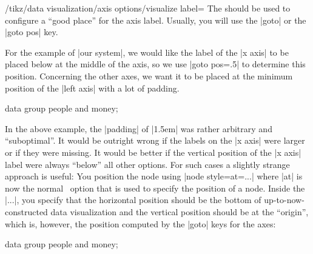 \begin{key}{/tikz/data visualization/axis options/visualize label=}
    The  should be used to configure a ``good place'' for the
    axis label. Usually, you will use the |goto| or the |goto pos| key.

    For the example of |our system|, we would like the label of the |x axis| to
    be placed below at the middle of the axis, so we use |goto pos=.5| to
    determine this position. Concerning the other axes, we want it to be placed
    at the minimum position of the |left axis| with a lot of padding.
\begin{codeexample}[width=7cm,preamble={\usetikzlibrary{datavisualization}}]
%
\tikz \datavisualization [
    our system,
    x axis={attribute=time, ticks=some, label},
    left axis ={attribute=money},
    right axis={attribute=people},
    visualize as line/.list={
      people 1, people 2, money 1, money 2}]
  data group {people and money};
\end{codeexample}

    In the above example, the |padding| of |1.5em| was rather arbitrary and
    ``suboptimal''. It would be outright wrong if the labels on the |x axis|
    were larger or if they were missing. It would be better if the vertical
    position of the |x axis| label were always ``below'' all other options. For
    such cases a slightly strange approach is useful: You position the node
    using |node style={at=...}| where |at| is now the normal \tikzname\ option
    that is used to specify the position of a node. Inside the |...|, you
    specify that the horizontal position should be the bottom of
    up-to-now-constructed data visualization and the vertical position should
    be at the ``origin'', which is, however, the position computed by the
    |goto| keys for the axes:
\begin{codeexample}[width=7cm,preamble={\usetikzlibrary{datavisualization}}]
%
\tikz \datavisualization [
    our system,
    x axis={attribute=time, ticks=some, label=Year},
    left axis ={attribute=money},
    right axis={attribute=people},
    visualize as line/.list={
      people 1, people 2, money 1, money 2}]
  data group {people and money};
\end{codeexample}


\end{key}
